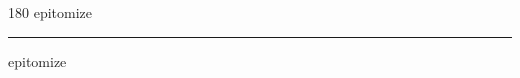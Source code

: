 
\begin{frame}
\begin{center}
\begin{turn}{180}
{\fontsize{2.5cm}{1em}\selectfont epitomize}
\end{turn}
\vspace{1em}\par  
\hrule
\vspace{1em}\par  
{\fontsize{2.5cm}{1em}\selectfont epitomize}
\end{center}
\end{frame}
